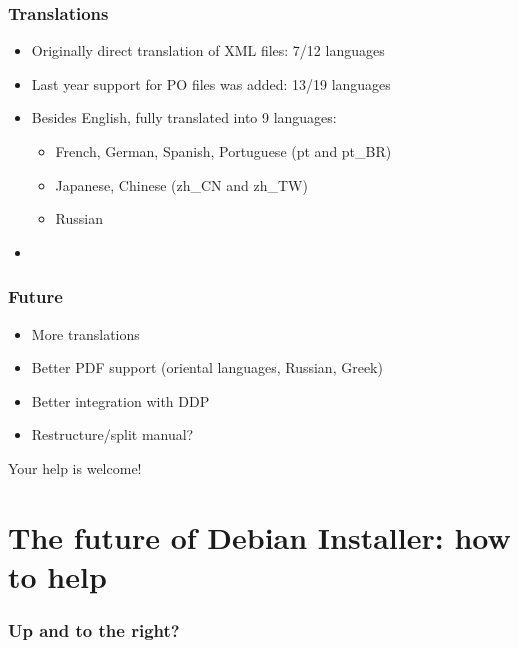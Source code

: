 \documentclass{beamer}
\begin{document}
\begin{frame}
  \frametitle{Translations}
	\begin{itemize}
	\item
		Originally direct translation of XML files: 7/12 languages
	\item
		Last year support for PO files was added: 13/19 languages
	\item
		Besides English, fully translated into 9 languages:
		\begin{itemize}
		\item
			French, German, Spanish, Portuguese (pt and pt\_BR)
		\item
			Japanese, Chinese (zh\_CN and zh\_TW)
		\item
			Russian
		\end{itemize}
	\item
		
	\end{itemize}
\end{frame}

\begin{frame}
  \frametitle{Future}
	\begin{itemize}
	\item
		More translations
	\item
		Better PDF support (oriental languages, Russian, Greek)
	\item
		Better integration with DDP
	\item
		Restructure/split manual?
	\end{itemize}
	
	Your help is welcome!
\end{frame}


\section{The future of Debian Installer: how to help}

\begin{frame}
  \frametitle{Up and to the right?}
\end{frame}
\end{document}
